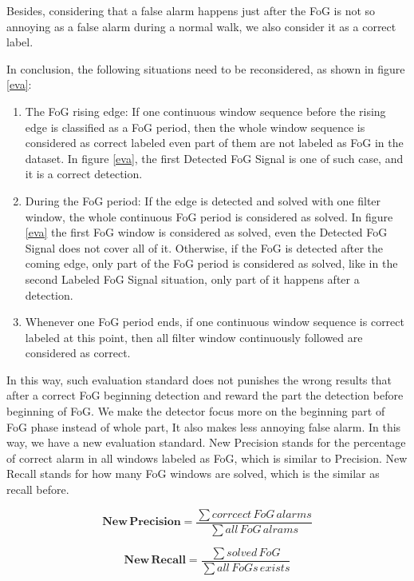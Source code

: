 \documentclass[article]{article}
\begin{document}
    Besides, considering that a false alarm happens just after the FoG is not so annoying as a false alarm during a normal walk, we also consider it as a correct label.
    
    In conclusion, the following situations need to be reconsidered, as shown in figure \ref{eva}:

    \begin{enumerate}
    	\item The FoG rising edge: If one continuous window sequence before the rising edge is classified as a FoG period, then the whole window sequence is considered as correct labeled even part of them are not labeled as FoG in the dataset. In figure \ref{eva}, the first Detected FoG Signal is one of such case, and it is a correct detection.
    	
		\item During the FoG period: If the edge is detected and solved with one filter window, the whole continuous FoG period is considered as solved.  In figure \ref{eva} the first FoG window is considered as solved, even the Detected FoG Signal does not cover all of it. Otherwise, if the FoG is detected after the coming edge, only part of the FoG period is considered as solved, like in the second Labeled FoG Signal situation, only part of it happens after a detection.
		
		\item Whenever one FoG period ends, if one continuous window sequence is correct labeled at this point, then all filter window continuously followed are considered as correct.		
    \end{enumerate}

	In this way, such evaluation standard does not punishes the wrong results that 
	after a correct FoG beginning detection and reward the part the detection before beginning of FoG. We make the detector focus more on the beginning part of FoG phase instead of whole part, It also makes less annoying false alarm.
	In this way, we have a new evaluation standard. New Precision stands for the percentage of correct alarm in all windows labeled as FoG, which is similar to Precision. New Recall stands for how many FoG windows are solved, which is the similar as recall before.
	
	\begin{equation}
	\mathbf{New\,Precision} = \frac{\sum corrcect\,FoG\,alarms}{\sum all\,FoG\,alrams}
	\end{equation}
	
	\begin{equation}
	\mathbf{New\,Recall} = \frac{\sum solved\,FoG}{\sum all\,FoGs\,exists}
	\end{equation}
	
\end{document}
